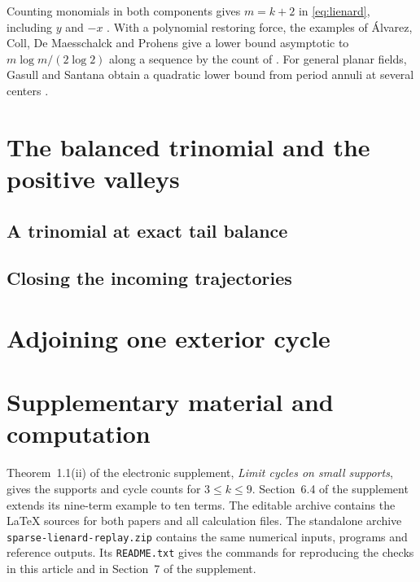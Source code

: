 Counting monomials in both components gives $m=k+2$ in
\eqref{eq:lienard}, including $y$ and $-x$ \cite[\S2.5, Problem~8]{Gasull2021}.
With a polynomial restoring force, the examples of \'Alvarez, Coll,
De Maesschalck and Prohens \cite{ACDP} give a lower bound asymptotic
to $m\log m/(2\log 2)$ along a sequence by the count of
\cite[Theorems~1.2, 3.6 and \S5]{BCG}. For general planar fields,
Gasull and Santana obtain a quadratic lower bound from period annuli
at several centers \cite[Theorem~1 and \S3]{GS}.



\section{The balanced trinomial and the positive valleys}\label{sec:valleys}
\subsection{A trinomial at exact tail balance}\label{subsec:seed-main}




\subsection{Closing the incoming trajectories}\label{subsec:fold-closure}





\appendix
\section{Adjoining one exterior cycle}\label{app:extension}


\section*{Supplementary material and computation}
Theorem~1.1(ii) of the electronic supplement, \emph{Limit cycles on
small supports}, gives the supports and cycle counts for $3\le k\le9$.
Section~6.4 of the supplement extends its nine-term example to ten terms.
The editable archive contains the LaTeX sources for both papers and
all calculation files. The standalone archive \texttt{sparse-lienard-replay.zip}
contains the same numerical inputs, programs and reference outputs.
Its \texttt{README.txt} gives the commands for reproducing the checks in
this article and in Section~7 of the supplement.

